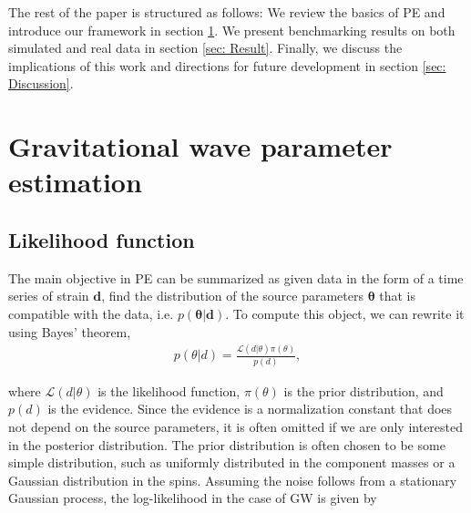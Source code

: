 \documentclass[twocolumn]{aastex631}
\begin{document}

The rest of the paper is structured as follows: We review the basics of PE and
introduce our framework in section \ref{sec: PE}. We present benchmarking
results on both simulated and real data in section \ref{sec: Result}. Finally,
we discuss the implications of this work and directions for future development
in section \ref{sec: Discussion}.

\section{Gravitational wave parameter estimation}
\label{sec: PE}

\subsection{Likelihood function}
\label{sec:likelihood}

The main objective in PE can be summarized as given data in the form of a time
series of strain $\mathbf{d}$, find the distribution of the source parameters
$\mathbf{\theta}$ that is compatible with the data, i.e.
$p(\mathbf{\theta}|\mathbf{d})$. To compute this object, we can rewrite
it using Bayes' theorem,
\begin{align}
    p(\theta| d) = \frac{\mathcal{L}(d|\theta)\pi(\theta)}{p(d)},
\end{align}

where $\mathcal{L}(d|\theta)$ is the likelihood function, $\pi(\theta)$ is the
prior distribution, and $p(d)$ is the evidence. Since the evidence is a
normalization constant that does not depend on the source parameters, it is
often omitted if we are only interested in the posterior distribution. The prior
distribution is often chosen to be some simple distribution, such as uniformly
distributed in the component masses or a Gaussian distribution in the spins.
Assuming the noise follows from a stationary Gaussian process, the
log-likelihood in the case of GW is given by
\end{document}
